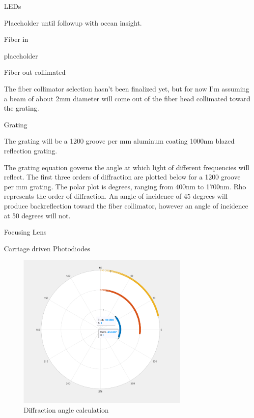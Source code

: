    LEDs

Placeholder until followup with ocean insight.

    Fiber in

placeholder

    Fiber out collimated

The fiber collimator selection hasn’t been finalized yet, but for now I’m assuming a beam of about 2mm diameter will come out of the fiber head collimated toward the grating.

    Grating

    The grating will be a 1200 groove per mm aluminum coating 1000nm blazed reflection grating. 
 
The grating equation governs the angle at which light of different frequencies will reflect. 
The first three orders of diffraction are plotted below for a 1200 groove per mm grating. The polar plot is degrees, ranging from 400nm to 1700nm. Rho represents the order of diffraction.
An angle of incidence of 45 degrees will produce backreflection toward the fiber collimator, however an angle of incidence at 50 degrees will not.

    Focusing Lens

    Carriage driven Photodiodes

    


\begin{figure}[H]
    \caption{Diffraction angle calculation}
    \centering
    \includegraphics[width=0.75\textwidth]{images/DiffractionAngleCalculator.png}
\end{figure}

